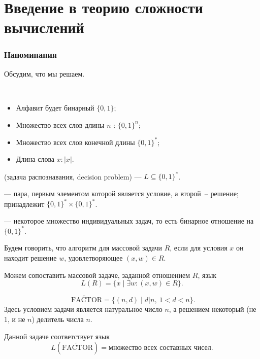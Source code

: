 \chapter{Введение в теорию сложности вычислений}
\subsection{Напоминания}
Обсудим, что мы решаем.
\begin{name}
	~\begin{itemize}
		\item Алфавит будет бинарный  $\{0, 1\}$;
		\item Множество всех слов длины $ n$ : $ \{0, 1\}^{n}$;
		\item Множество всех слов конечной длины  $ \{0, 1\}^{*}$;
		\item Длина слова $ x\colon  \lvert x \rvert $.
	\end{itemize}
\end{name}

\begin{defn}
	 (задача распознавания, decision problem) ---  $ L \subseteq \{0, 1\}^{*}$.

	\noindent
	 --- пара, первым элементом которой является условие, а второй~-- решение; принадлежит $ \{0, 1\}^{*} \times \{0, 1\}^{*}$.

	\noindent
	 --- некоторое множество индивидуальных задач, то есть бинарное отношение на $ \{0, 1\}^{*}$.
\end{defn}

\begin{defn}
	Будем говорить, что алгоритм  для массовой задачи $ R$, если для условия $ x$ он находит решение $ w$, удовлетворяющее $ (x, w) \in R$.

	\noindent
	Можем сопоставить массовой задаче, заданной отношением $ R$, язык
	\[
		L(R) = \{x \mid \exists w\colon (x, w) \in R\}
	.\]
\end{defn}

\begin{ex}
	\[
		\widetilde{\text{ FACTOR}} = \{(n, d) \mid d | n, ~ 1<d<n\}
	.\]
	Здесь условием задачи является натуральное число  $ n$, а решением некоторый (не 1, и не $ n$) делитель числа $ n$.

	Данной задаче соответствует язык
	\[
		L(\widetilde{\text{FACTOR}}) = \text{множество всех составных чисел}
	.\]
\end{ex}

